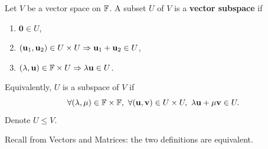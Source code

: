 \documentclass[a4paper,11pt]{article}
\begin{document}
\begin{definition}[Subspace]
    Let $V$ be a vector space on ${\mathbb{F}}$. A subset $U$ of $V$ is a \textbf{vector subspace} if 
    \begin{enumerate}
        \item $ \mathbf{0}\in U $,
        \item $ ({\bf u}_1,{\bf u}_2)\in U\times U \Rightarrow \mathbf{u}_1+\mathbf{u}_2\in U $,
        \item $ (\lambda,{\bf u})\in {\mathbb{F}}\times U \Rightarrow \lambda{\bf u}\in U $.
    \end{enumerate}
    Equivalently, $U$ is a subspace of $V$ if 
    \[
        \forall (\lambda,\mu)\in {\mathbb{F}}\times {\mathbb{F}},\ \forall ({\bf u},{\bf v})\in U\times U,\ \lambda{\bf u}+\mu{\bf v}\in U.
    \]
    Denote $ U\le V $.
\end{definition}
Recall from Vectors and Matrices: the two definitions are equivalent.
\end{document}
